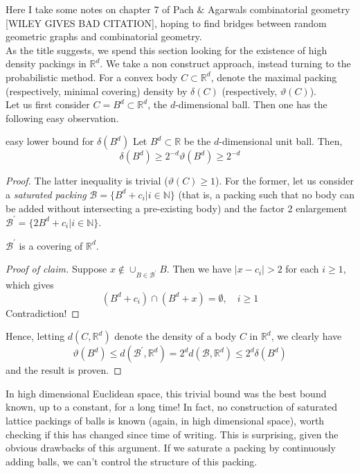 \documentclass{article}
\begin{document}
Here I take some notes on chapter 7 of Pach $\&$ Agarwals combinatorial geometry [WILEY GIVES BAD CITATION], 
hoping to find bridges between random geometric graphs and combinatorial geometry. \\ 

As the title suggests, we spend this section looking for the existence of high density packings in $\mathbb{R}^d$. 
We take a non construct approach, instead turning to the probabilistic method. For a convex body $C \subset \mathbb{R}^d$, 
denote the maximal packing (respectively, minimal covering) density by $\delta(C)$ (respectively, $\vartheta(C)$). \\

Let us first consider $C = B^d \subset \mathbb{R}^d$, the $d$-dimensional ball. Then one has the following easy 
observation. 

\begin{proposition}[]{easy lower bound for $\delta(B^d)$}
    Let $B^d \subset \mathbb{R}$ be the $d$-dimensional unit ball. Then, 
    \[\delta(B^d) \geq 2^{-d}\vartheta(B^d) \geq 2^{-d}\]
\end{proposition}

\begin{proof}
    The latter inequality is trivial ($\vartheta(C) \geq 1$). For the former, let us consider a {\it saturated 
    packing} $\mathcal{B} = \{B^d + c_i | i \in \mathbb{N}\}$ (that is, a packing such that 
    no body can be added without intersecting a pre-existing body) and the factor 2 enlargement 
    $\mathcal{B}^\prime = \{2B^d + c_i | i \in \mathbb{N}\}$.
    \begin{claim}
        $\mathcal{B}^\prime$ is a covering of $\mathbb{R}^d$.
    \end{claim}
    \begin{proof}[Proof of claim]
        Suppose $x \notin \cup_{B \in \mathcal{B}^\prime} B$. Then we have $\lvert x - c_i \rvert > 2$ for each $i \geq 1$, 
        which gives \[(B^d + c_i) \cap (B^d + x) = \emptyset, \quad i \geq 1\] Contradiction!
    \end{proof}
    Hence, letting $d(C, \mathbb{R}^d)$ denote the density of a body $C$ in $\mathbb{R}^d$, we clearly have 
    \[\vartheta(B^d) \leq d(\mathcal{B}^\prime, \mathbb{R}^d) = 2^d d(\mathcal{B}, \mathbb{R}^d) \leq 2^d \delta(B^d)\] 
    and the result is proven. 
\end{proof}

In high dimensional Euclidean space, this trivial bound was the best bound known, up to a constant, for a long 
time! In fact, no construction of saturated lattice packings of balls is known (again, in high dimensional space), worth 
checking if this has changed since time of writing. This is surprising, given the obvious drawbacks of this argument. 
If we saturate a packing by continuously adding balls, we can't control the structure of this packing. \\ 
\end{document}
